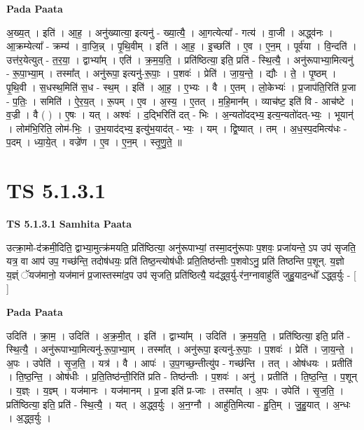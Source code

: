\documentclass[17pt]{extarticle}
\begin{document}
\textbf{Pada Paata} \newline

अ॒ख्य॒त् । इति॑ । आ॒ह॒ । अनु॑ख्यात्या॒ इत्यनु॑ - ख्या॒त्यै॒ । आ॒गत्येत्या᳚ - गत्य॑ । वा॒जी । अद्ध्व॑नः । आ॒क्रम्येत्या᳚ - क्रम्य॑ । वा॒जि॒न्न् । पृ॒थि॒वीम् । इति॑ । आ॒ह॒ । इ॒च्छति॑ । ए॒व । ए॒न॒म् । पूर्व॑या । वि॒न्दति॑ । उत्त॑र॒येत्युत् - त॒र॒या॒ । द्वाभ्या᳚म् । एति॑ । क्र॒म॒य॒ति॒ । प्रति॑ष्ठित्या॒ इति॒ प्रति॑ - स्थि॒त्यै॒ । अनु॑रूपाभ्या॒मित्यनु॑ - रू॒पा॒भ्या॒म् । तस्मा᳚त् । अनु॑रूपा॒ इत्यनु॑-रू॒पाः॒ । प॒शवः॑ । प्रेति॑ । जा॒य॒न्ते॒ । द्यौः । ते॒ । पृ॒ष्ठम् । पृ॒थि॒वी । स॒धस्थ॒मिति॑ स॒ध - स्थ॒म् । इति॑ । आ॒ह॒ । ए॒भ्यः । वै । ए॒तम् । लो॒केभ्यः॑ । प्र॒जाप॑ति॒रिति॑ प्र॒जा - प॒तिः॒ । समिति॑ । ऐ॒र॒य॒त् । रू॒पम् । ए॒व । अ॒स्य॒ । ए॒तत् । म॒हि॒मान᳚म् । व्याच॑ष्ट॒ इति॑ वि - आच॑ष्टे । व॒ज्री । वै ( ) । ए॒षः । यत् । अश्वः॑ । द॒द्भिरिति॑ दत् - भिः । अ॒न्यतो॑दद्भ्य॒ इत्य॒न्यतो॑दत्-भ्यः॒ । भूयान्॑ । लोम॑भि॒रिति॒ लोम॑-भिः॒ । उ॒भ॒याद॑द्भ्य॒ इत्यु॑भ॒याद॑त् - भ्यः॒ । यम् । द्वि॒ष्यात् । तम् । अ॒ध॒स्प॒दमित्य॑धः - प॒दम् । ध्या॒ये॒त् । वज्रे॑ण । ए॒व । ए॒न॒म् । स्तृ॒णु॒ते॒ ॥  \newline





\section{ TS 5.1.3.1 }

\textbf{TS 5.1.3.1 } \newline
\textbf{Samhita Paata} \newline

उत्क्रा॒मो-द॑क्रमी॒दिति॒ द्वाभ्या॒मुत्क्र॑मयति॒ प्रति॑ष्ठित्या॒ अनु॑रूपाभ्यां॒ तस्मा॒दनु॑रूपाः प॒शवः॒ प्रजा॑यन्ते॒ ऽप उप॑ सृजति॒ यत्र॒ वा आप॑ उप॒ गच्छ॑न्ति॒ तदोष॑धयः॒ प्रति॑ तिष्ठ॒न्त्योष॑धीः प्रति॒तिष्ठ॑न्तीः प॒शवोऽनु॒ प्रति॑ तिष्ठन्ति प॒शून्. य॒ज्ञो य॒ज्ञ्ं ॅयज॑मानो॒ यज॑मानं प्र॒जास्तस्मा॑द॒प उप॑ सृजति॒ प्रति॑ष्ठित्यै॒ यद॑द्ध्व॒र्यु-र॑न॒ग्नावाहु॑तिं जुहु॒याद॒न्धो᳚ ऽद्ध्व॒र्युः - [  ] \newline

\textbf{Pada Paata} \newline

उदिति॑ । क्रा॒म॒ । उदिति॑ । अ॒क्र॒मी॒त् । इति॑ । द्वाभ्या᳚म् । उदिति॑ । क्र॒म॒य॒ति॒ । प्रति॑ष्ठित्या॒ इति॒ प्रति॑ - स्थि॒त्यै॒ । अनु॑रूपाभ्या॒मित्यनु॑-रू॒पा॒भ्या॒म् । तस्मा᳚त् । अनु॑रूपा॒ इत्यनु॑-रू॒पाः॒ । प॒शवः॑ । प्रेति॑ । जा॒य॒न्ते॒ । अ॒पः । उपेति॑ । सृ॒ज॒ति॒ । यत्र॑ । वै । आपः॑ । उ॒प॒गच्छ॒न्तीत्यु॑प - गच्छ॑न्ति । तत् । ओष॑धयः । प्रतीति॑ । ति॒ष्ठ॒न्ति॒ । ओष॑धीः । प्र॒ति॒तिष्ठ॑न्ती॒रिति॑ प्रति - तिष्ठ॑न्तीः । प॒शवः॑ । अनु॑ । प्रतीति॑ । ति॒ष्ठ॒न्ति॒ । प॒शून् । य॒ज्ञ्ः । य॒ज्ञ्म् । यज॑मानः । यज॑मानम् । प्र॒जा इति॑ प्र-जाः । तस्मा᳚त् । अ॒पः । उपेति॑ । सृ॒ज॒ति॒ । प्रति॑ष्ठित्या॒ इति॒ प्रति॑ - स्थि॒त्यै॒ । यत् । अ॒द्ध्व॒र्युः । अ॒न॒ग्नौ । आहु॑ति॒मित्या - हु॒ति॒म् । जु॒हु॒यात् । अ॒न्धः । अ॒द्ध्व॒र्युः ।  \newline
\end{document}
